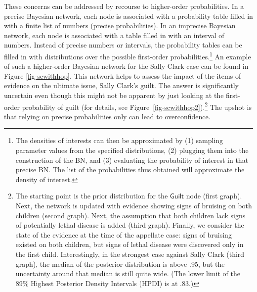 \documentclass[
  letterpaper,
  DIV=11,
  numbers=noendperiod]{scrartcl}
\newcommand{\s}[1]{\mbox{$\mathsf{#1}$}}
\begin{document}
These concerns can be addressed by recourse to higher-order
probabilities. In a precise Bayesian network, each node is associated
with a probability table filled in with a finite list of numbers
(precise probabilities). In an imprecise Bayesian network, each node is
associated with a table filled in with an interval of numbers. Instead
of precise numbers or intervals, the probability tables can be filled in
with distributions over the possible first-order
probabilities.\footnote{The densities of interests can then be
  approximated by (1) sampling parameter values from the specified
  distributions, (2) plugging them into the construction of the BN, and
  (3) evaluating the probability of interest in that precise BN. The
  list of the probabilities thus obtained will approximate the density
  of interest.} An example of such a higher-order Bayesian network for
the Sally Clark case can be found in Figure \ref{fig-scwithhop}. This
network helps to assess the impact of the items of evidence on the
ultimate issue, Sally Clark's guilt. The answer is significantly
uncertain even though this might not be apparent by just looking at the
first-order probability of guilt (for details, see
Figure~\ref{fig-scwithhop2}).\footnote{The starting point is the prior
  distribution for the \s{Guilt} node (first graph). Next, the network
  is updated with evidence showing signs of bruising on both children
  (second graph). Next, the assumption that both children lack signs of
  potentially lethal disease is added (third graph). Finally, we
  consider the state of the evidence at the time of the appellate case:
  signs of bruising existed on both children, but signs of lethal
  disease were discovered only in the first child. Interestingly, in the
  strongest case against Sally Clark (third graph), the median of the
  posterior distribution is above .95, but the uncertainty around that
  median is still quite wide. (The lower limit of the 89\% Highest
  Posterior Density Intervals (HPDI) is at .83.)} The upshot is that
relying on precise probabilities only can lead to overconfidence.
\end{document}
